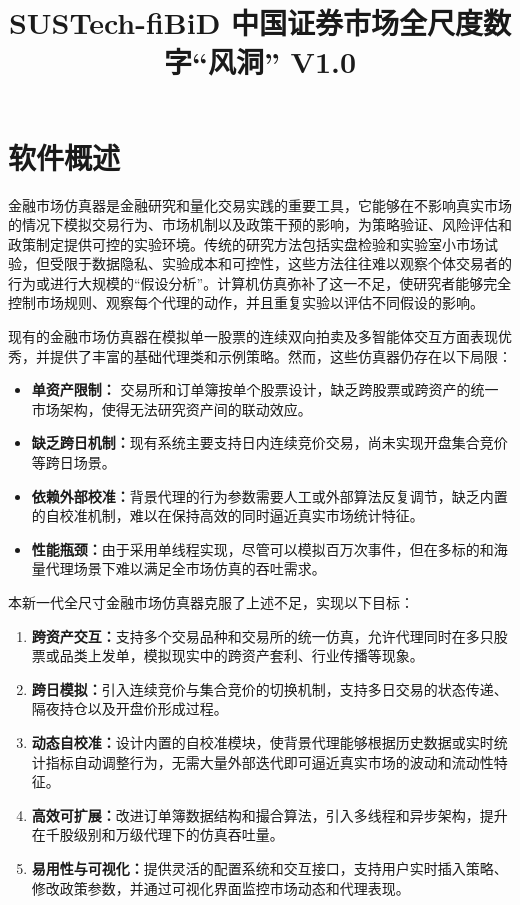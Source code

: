 \documentclass{mancls}
\title{SUSTech-fiBiD 中国证券市场全尺度数字“风洞”  V1.0}
\begin{document}
\section{软件概述}
金融市场仿真器是金融研究和量化交易实践的重要工具，它能够在不影响真实市场的情况下模拟交易行为、市场机制以及政策干预的影响，为策略验证、风险评估和政策制定提供可控的实验环境。传统的研究方法包括实盘检验和实验室小市场试验，但受限于数据隐私、实验成本和可控性，这些方法往往难以观察个体交易者的行为或进行大规模的“假设分析”。计算机仿真弥补了这一不足，使研究者能够完全控制市场规则、观察每个代理的动作，并且重复实验以评估不同假设的影响。

现有的金融市场仿真器在模拟单一股票的连续双向拍卖及多智能体交互方面表现优秀，并提供了丰富的基础代理类和示例策略。然而，这些仿真器仍存在以下局限：
\begin{itemize}
  \item \textbf{单资产限制：} 交易所和订单簿按单个股票设计，缺乏跨股票或跨资产的统一市场架构，使得无法研究资产间的联动效应。
  \item \textbf{缺乏跨日机制：}现有系统主要支持日内连续竞价交易，尚未实现开盘集合竞价等跨日场景。
  \item \textbf{依赖外部校准：}背景代理的行为参数需要人工或外部算法反复调节，缺乏内置的自校准机制，难以在保持高效的同时逼近真实市场统计特征。
  \item \textbf{性能瓶颈：}由于采用单线程实现，尽管可以模拟百万次事件，但在多标的和海量代理场景下难以满足全市场仿真的吞吐需求。
\end{itemize}

本新一代全尺寸金融市场仿真器克服了上述不足，实现以下目标：
\begin{enumerate}
  \item \textbf{跨资产交互：}支持多个交易品种和交易所的统一仿真，允许代理同时在多只股票或品类上发单，模拟现实中的跨资产套利、行业传播等现象。
  \item \textbf{跨日模拟：}引入连续竞价与集合竞价的切换机制，支持多日交易的状态传递、隔夜持仓以及开盘价形成过程。
  \item \textbf{动态自校准：}设计内置的自校准模块，使背景代理能够根据历史数据或实时统计指标自动调整行为，无需大量外部迭代即可逼近真实市场的波动和流动性特征。
  \item \textbf{高效可扩展：}改进订单簿数据结构和撮合算法，引入多线程和异步架构，提升在千股级别和万级代理下的仿真吞吐量。
  \item \textbf{易用性与可视化：}提供灵活的配置系统和交互接口，支持用户实时插入策略、修改政策参数，并通过可视化界面监控市场动态和代理表现。
\end{enumerate}
\end{document}
